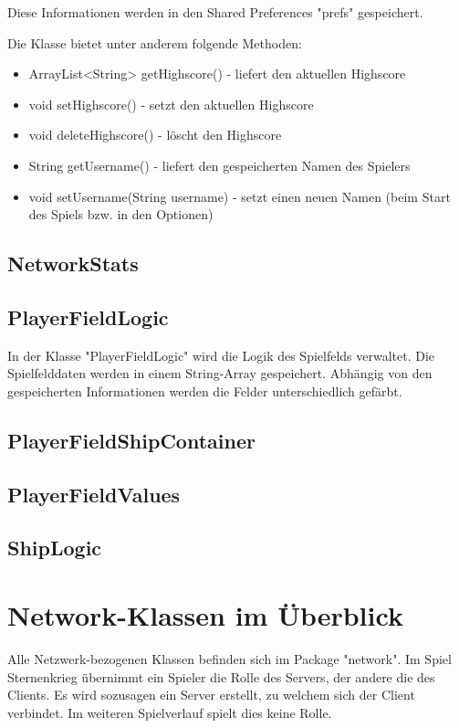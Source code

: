 \documentclass[11pt]{article} %
\begin{document}
Diese Informationen werden in den Shared Preferences "prefs" gespeichert. 

Die Klasse bietet unter anderem folgende Methoden:
\begin{itemize}
\item ArrayList<String> getHighscore() - liefert den aktuellen Highscore
\item void setHighscore() - setzt den aktuellen Highscore
\item void deleteHighscore() - löscht den Highscore

\item String getUsername() - liefert den gespeicherten Namen des Spielers
\item void setUsername(String username) - setzt einen neuen Namen (beim Start des Spiels bzw. in den Optionen)
\end{itemize}

\subsection{NetworkStats}

\subsection{PlayerFieldLogic}
In der Klasse "PlayerFieldLogic" wird die Logik des Spielfelds verwaltet. Die Spielfelddaten werden in einem String-Array gespeichert. Abhängig von den gespeicherten Informationen werden die Felder unterschiedlich gefärbt.

\subsection{PlayerFieldShipContainer}

\subsection{PlayerFieldValues}

\subsection{ShipLogic}

\section{Network-Klassen im Überblick}
Alle Netzwerk-bezogenen Klassen befinden sich im Package "network". Im Spiel Sternenkrieg übernimmt ein Spieler die Rolle des Servers, der andere die des Clients. Es wird sozusagen ein Server erstellt, zu welchem sich der Client verbindet. Im weiteren Spielverlauf spielt dies keine Rolle.
\end{document}
